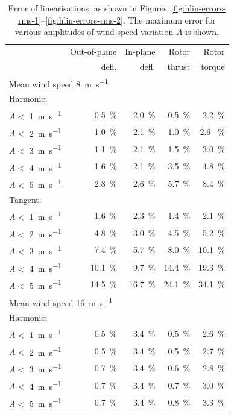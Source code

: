 \documentclass[a4paper,preprint]{elsarticle}
\begin{document}
\begin{table}
  \centering
  \caption{Error of linearisations, as shown in
    Figures~\protect\ref{fig:hlin-errors-rms-1}--\protect\ref{fig:hlin-errors-rms-2}. The
    maximum error for various amplitudes of wind speed variation $A$ is shown.}
  \label{tab:hlin-errors-peak}
  \begin{tabular}{lrrrr}
    \toprule
     & Out-of-plane & In-plane & Rotor & Rotor \\
     & defl. & defl. & thrust & torque \\
    \midrule
    \multicolumn{4}{l}{Mean wind speed \SI{8}{\metre\per\second}} \\[1em]
    \multicolumn{4}{l}{Harmonic:} \\
    $A<$ \SI{ 1 }{\metre\per\second}& \SI{ 0.5 }{\%}& \SI{ 2.0 }{\%}& \SI{ 0.5 }{\%}& \SI{ 2.2 }{\%}\\
    $A<$ \SI{ 2 }{\metre\per\second}& \SI{ 1.0 }{\%}& \SI{ 2.1 }{\%}& \SI{ 1.0 }{\%}& \SI{ 2.6
 }{\%}\\
    $A<$ \SI{ 3 }{\metre\per\second}& \SI{ 1.1 }{\%}& \SI{ 2.1 }{\%}& \SI{ 1.5 }{\%}& \SI{ 3.0 }{\%}\\
    $A<$ \SI{ 4 }{\metre\per\second}& \SI{ 1.6 }{\%}& \SI{ 2.1 }{\%}& \SI{ 3.5 }{\%}& \SI{ 4.8 }{\%}\\
    $A<$ \SI{ 5 }{\metre\per\second}& \SI{ 2.8 }{\%}& \SI{ 2.6 }{\%}&
                                                                        \SI{ 5.7 }{\%}& \SI{ 8.4 }{\%}\\
    \multicolumn{4}{l}{Tangent:} \\
    $A<$ \SI{ 1 }{\metre\per\second}& \SI{ 1.6 }{\%}& \SI{ 2.3 }{\%}& \SI{ 1.4 }{\%}& \SI{ 2.1 }{\%}\\
    $A<$ \SI{ 2 }{\metre\per\second}& \SI{ 4.8 }{\%}& \SI{ 3.0 }{\%}& \SI{ 4.5 }{\%}& \SI{ 5.2 }{\%}\\
    $A<$ \SI{ 3 }{\metre\per\second}& \SI{ 7.4 }{\%}& \SI{ 5.7 }{\%}& \SI{ 8.0 }{\%}& \SI{ 10.1 }{\%}\\
    $A<$ \SI{ 4 }{\metre\per\second}& \SI{ 10.1 }{\%}& \SI{ 9.7 }{\%}& \SI{ 14.4 }{\%}& \SI{ 19.3 }{\%}\\
    $A<$ \SI{ 5 }{\metre\per\second}& \SI{ 14.5 }{\%}& \SI{ 16.7 }{\%}& \SI{ 24.1 }{\%}& \SI{ 34.1 }{\%}\\[1em]

    \midrule
    \multicolumn{4}{l}{Mean wind speed \SI{16}{\metre\per\second}} \\[1em]
    \multicolumn{4}{l}{Harmonic:} \\
$A<$ \SI{ 1 }{\metre\per\second}& \SI{ 0.5 }{\%}& \SI{ 3.4 }{\%}& \SI{ 0.5 }{\%}& \SI{ 2.6 }{\%}\\
$A<$ \SI{ 2 }{\metre\per\second}& \SI{ 0.5 }{\%}& \SI{ 3.4 }{\%}& \SI{ 0.5 }{\%}& \SI{ 2.7 }{\%}\\
$A<$ \SI{ 3 }{\metre\per\second}& \SI{ 0.7 }{\%}& \SI{ 3.4 }{\%}& \SI{ 0.6 }{\%}& \SI{ 2.8 }{\%}\\
$A<$ \SI{ 4 }{\metre\per\second}& \SI{ 0.7 }{\%}& \SI{ 3.4 }{\%}& \SI{ 0.7 }{\%}& \SI{ 3.0 }{\%}\\
$A<$ \SI{ 5 }{\metre\per\second}& \SI{ 0.7 }{\%}& \SI{ 3.4 }{\%}& \SI{ 0.8 }{\%}& \SI{ 3.3 }{\%}\\[1em]


\end{tabular}
\end{table}
\end{document}
